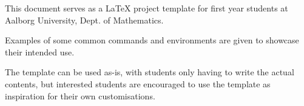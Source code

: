 

This document serves as a \LaTeX{} project template for first year students at Aalborg University, Dept. of Mathematics.

Examples of some common commands and environments are given to showcase their intended use.

The template can be used as-is, with students only having to write the actual contents, but interested students are encouraged to use the template as inspiration for their own customisations.